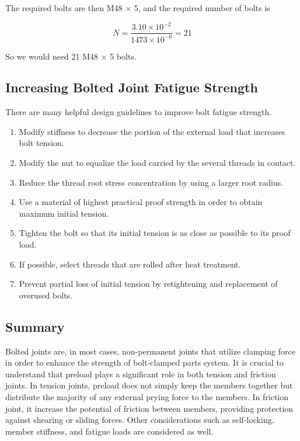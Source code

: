 \documentclass[a4paper,openany,nobib]{tufte-book}
\begin{document}
{{The required bolts are then M48 \(\times\) 5, and the required number of
bolts is

$$N = \frac{3.10 \times 10^{-2}}{1473 \times 10^{-6}} = 21$$

So we would need 21 M48 \(\times\) 5 bolts.

\subsection{Increasing Bolted Joint Fatigue Strength}
\label{increasing-bolted-joint-fatigue-strength}
There are many helpful design guidelines to improve bolt fatigue
strength.

\begin{enumerate}
\item Modify stiffness to decrease the portion of the external load that
increases bolt tension.

\item Modify the nut to equalize the load carried by the several threads in
contact.

\item Reduce the thread root stress concentration by using a larger root
radius.

\item Use a material of highest practical proof strength in order to obtain
maximum initial tension.

\item Tighten the bolt so that its initial tension is as close as possible
to its proof load.

\item If possible, select threads that are rolled after heat treatment.

\item Prevent partial loss of initial tension by retightening and
replacement of overused bolts.
\end{enumerate}

\subsection{Summary}
\label{summary-7}
Bolted joints are, in most cases, non-permanent joints that utilize
clamping force in order to enhance the strength of bolt-clamped parts
system. It is crucial to understand that preload plays a significant
role in both tension and friction joints. In tension joints, preload
does not simply keep the members together but distribute the majority of
any external prying force to the members. In friction joint, it increase
the potential of friction between members, providing protection against
shearing or sliding forces. Other considerations such as self-locking,
member stiffness, and fatigue loads are considered as well.

}}
\end{document}
